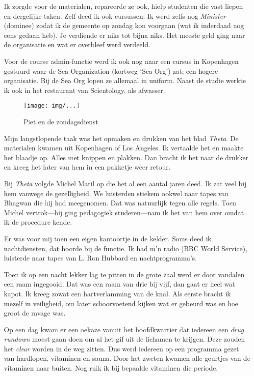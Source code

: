 \documentclass[10pt,twoside,openright]{memoir}
\begin{document}
Ik zorgde voor de materialen, repareerde ze ook, hielp studenten die vast liepen en dergelijke taken. Zelf deed ik ook cursussen. Ik werd zelfs nog \emph{Minister} (dominee) zodat ik de gemeente op zondag kon voorgaan (wat ik inderdaad nog eens gedaan heb). Je verdiende er niks tot bijna niks. Het meeste geld ging naar de organisatie en wat er overbleef werd verdeeld. 

Voor de course admin-functie werd ik ook nog naar een cursus in Kopenhagen gestuurd waar de Sea Organization (kortweg `Sea Org') zat; een hogere organisatie. Bij de Sea Org lopen ze allemaal in uniform. Naast de studie werkte ik ook in het restaurant van Scientology, als afwasser.

\begin{figure}[t]
\texttt{[image: img/...]}
\caption{Piet en de zondagsdienst}
\end{figure}

Mijn langstlopende taak was het opmaken en drukken van het blad \emph{Theta}. De materialen kwamen uit Kopenhagen of Los Angeles. Ik vertaalde het en maakte het blaadje op. Alles met knippen en plakken. Dan bracht ik het naar de drukker en kreeg het later van hem in een pakketje weer retour. 

Bij \emph{Theta} volgde Michel Matil op die het al een aantal jaren deed. Ik zat veel bij hem vanwege de gezelligheid. We luisterden stiekem ookwel naar tapes van Bhagwan die hij had meegenomen. Dat was natuurlijk tegen alle regels. Toen Michel vertrok---hij ging pedagogiek studeren---nam ik het van hem over omdat ik de procedure kende. 

Er was voor mij toen een eigen kantoortje in de kelder. Soms deed ik nachtdiensten, dat hoorde bij de functie. Ik had m’n radio (BBC World Service), luisterde naar tapes van L. Ron Hubbard en nachtprogramma’s. 

Toen ik op een nacht lekker lag te pitten in de grote zaal werd er door vandalen een raam ingegooid. Dat was een raam van drie bij vijf, dan gaat er heel wat kapot. Ik kreeg zowat een hartverlamming van de knal. Als eerste bracht ik mezelf in veiligheid, om later schoorvoetend kijken wat er gebeurd was en hoe groot de ravage was.

Op een dag kwam er een oekaze vanuit het hoofdkwartier dat iedereen een \emph{drug rundown} moest gaan doen om al het gif uit de lichamen te krijgen. Deze zouden het \emph{clear} worden in de weg zitten. Dus werd iedereen op een programma gezet van hardlopen, vitaminen en sauna. Door het zweten kwamen alle geurtjes van de vitaminen naar buiten. Nog ruik ik bij bepaalde vitaminen die periode. 
\end{document}
